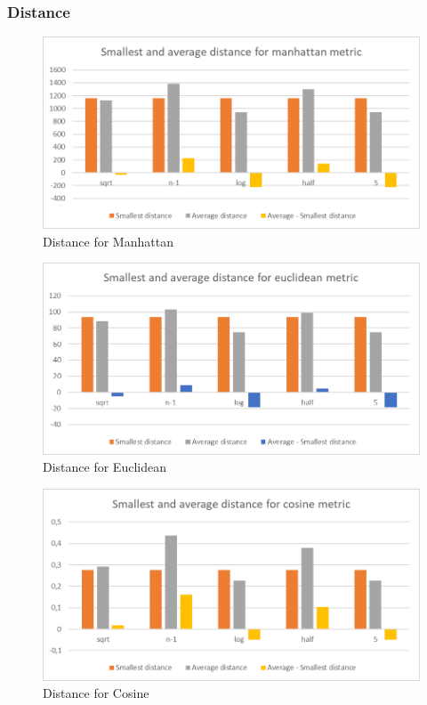 \documentclass[12pt]{article}
\begin{document}
\subsubsection{Distance}
\begin{figure}[H]
  \caption{Distance for Manhattan}
  \includegraphics[width=\textwidth]{distance_manhattan.png}
\end{figure}
\begin{figure}[H]
  \caption{Distance for Euclidean}
  \includegraphics[width=\textwidth]{distance_euclidean.png}
\end{figure}
\begin{figure}[H]
  \caption{Distance for Cosine}
  \includegraphics[width=\textwidth]{distance_cosine.png}
\end{figure}
\end{document}

